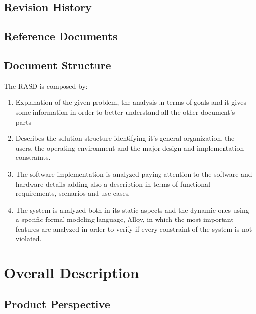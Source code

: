 \documentclass[a4paper]{article}
\begin{document}
    \subsection{Revision History}
    
    \subsection{Reference Documents}
    
    \subsection{Document Structure}
    The RASD is composed by:
    \begin{enumerate}
        \item Explanation of the given problem, the analysis in terms of goals and it gives some information in order to better understand all the other document's parts.
        \item Describes the solution structure identifying it's general organization, the users, the operating environment and the major design and implementation constraints.
        \item The software implementation is analyzed paying attention to the software and hardware details adding also a description in terms of functional requirements, scenarios and use cases.
        \item The system is analyzed both in its static aspects and the dynamic ones using a specific formal modeling language, Alloy, in which the most important features are analyzed in order to verify if every constraint of the system is not violated.
    \end{enumerate}
    
    \section{Overall Description}
    
    \subsection{Product Perspective}
    
\end{document}
